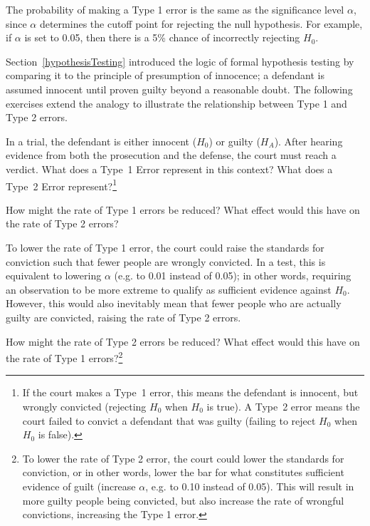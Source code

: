 \begin{spacing}{1.5}
The probability of making a Type 1 error is the same as the significance level $\alpha$, since $\alpha$ determines the cutoff point for rejecting the null hypothesis. For example, if $\alpha$ is set to 0.05, then there is a 5\% chance of incorrectly rejecting $H_0$. 

Section~\ref{hypothesisTesting} introduced the logic of formal hypothesis testing by comparing it to the principle of presumption of innocence; a defendant is assumed innocent until proven guilty beyond a reasonable doubt. The following exercises extend the analogy to illustrate the relationship between Type 1 and Type 2 errors.

\begin{exercise} \label{whatAreTheErrorTypesInUSCourts}
	In a trial, the defendant is either innocent ($H_0$) or guilty ($H_A$). After hearing evidence from both the prosecution and the defense, the court must reach a verdict. What does a Type~1 Error represent in this context? What does a Type~2 Error represent?\footnote{If the court makes a Type~1 error, this means the defendant is innocent, but wrongly convicted (rejecting $H_0$ when $H_0$ is true). A Type~2 error means the court failed to convict a defendant that was guilty (failing to reject $H_0$ when $H_0$ is false).}
\end{exercise}

\begin{example}{How might the rate of Type 1 errors be reduced? What effect would this have on the rate of Type 2 errors?}
	
	To lower the rate of Type 1 error, the court could raise the standards for conviction such that fewer people are wrongly convicted. In a test, this is equivalent to lowering $\alpha$ (e.g. to 0.01 instead of 0.05); in other words, requiring an observation to be more extreme to qualify as sufficient evidence against $H_0$. However, this would also inevitably mean that fewer people who are actually guilty are convicted, raising the rate of Type 2 errors.
\end{example}

\begin{exercise} \label{howToReduceType2ErrorsInUSCourts}
	How might the rate of Type 2 errors be reduced? What effect would this have on the rate of Type 1 errors?\footnote{To lower the rate of Type 2 error, the court could lower the standards for conviction, or in other words, lower the bar for what constitutes sufficient evidence of guilt (increase $\alpha$, e.g. to 0.10 instead of 0.05). This will result in more guilty people being convicted, but also increase the rate of wrongful convictions, increasing the Type 1 error.}
\end{exercise}


\end{spacing}
